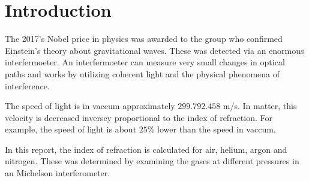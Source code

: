 \section{Introduction}


The 2017's Nobel price in physics was awarded to the group who confirmed Einstein's theory about gravitational waves. These was detected via an enormous interfermoeter. An interfermoeter can measure very small changes in optical paths and works by utilizing coherent light and the physical phenomena of interference. 

The speed of light is in vaccum approximately $299.792.458$ m/s. In matter, this velocity is decreased inversey proportional to the index of refraction. For example, the speed of light is about $25\%$ lower than the speed in vaccum.

In this report, the index of refraction is calculated for air, helium, argon and nitrogen. These was determined by examining the gases at different pressures in an Michelson interferometer.

